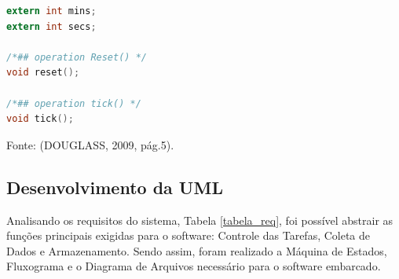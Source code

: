 \begin{lstlisting}[caption={Transcrição do Timer UML para código em C.},label={lst:codigo3},language=C]
extern int mins; 
extern int secs;

/*## operation Reset() */
void reset();

/*## operation tick() */
void tick();

\end{lstlisting}
\begin{center}
	Fonte: (DOUGLASS, 2009, pág.5).
\end{center}

\subsection{Desenvolvimento da UML}

Analisando os requisitos do sistema, Tabela \ref{tabela_req}, foi possível abstrair as funções principais exigidas para o software: Controle das Tarefas, Coleta de Dados e Armazenamento. Sendo assim, foram realizado a Máquina de Estados, Fluxograma e o Diagrama de Arquivos necessário para o software embarcado. 


